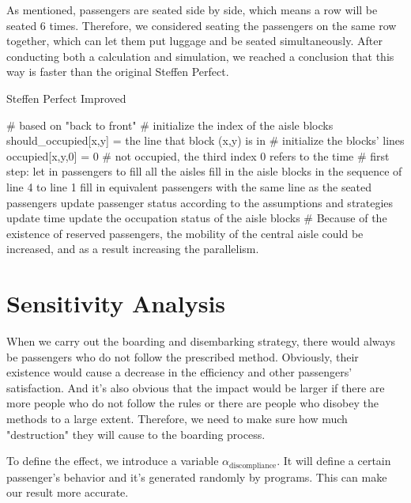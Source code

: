 \documentclass{article}
\begin{document}
	As mentioned, passengers are seated side by side, which means a row will be seated 6 times. Therefore, we considered seating the passengers on the same row together, which can let them put luggage and be seated simultaneously. After conducting both a calculation and simulation, we reached a conclusion that this way is faster than the original Steffen Perfect.

	\begin{algorithm}
		\caption{Steffen Perfect Improved}
		\begin{algorithmic}
			\STATE \# based on "back to front"
			\STATE \# initialize the index of the aisle blocks
			\STATE should\_occupied[x,y] = the line that block (x,y) is in \# initialize the blocks' lines
			\STATE occupied[x,y,0] = 0 \# not occupied, the third index 0 refers to the time
			\STATE \# first step: let in passengers to fill all the aisles
			\ENDFOR
			\STATE fill in the aisle blocks in the sequence of line 4 to line 1
			\ENDWHILE
			\STATE fill in equivalent passengers with the same line as the seated passengers
			\ENDIF
			\STATE update passenger status according to the assumptions and strategies
			\STATE update time
			\STATE update the occupation status of the aisle blocks
			\STATE \# Because of the existence of reserved passengers, the mobility of the central aisle could be increased, and as a result increasing the parallelism.
			\ENDWHILE
		\end{algorithmic}
	\end{algorithm}
	\section{Sensitivity Analysis}
	When we carry out the boarding and disembarking strategy, there would always be passengers who do not follow the prescribed method. Obviously, their existence would cause a decrease in the efficiency and other passengers' satisfaction. And it's also obvious that the impact would be larger if there are more people who do not follow the rules or there are people who disobey the methods to a large extent. Therefore, we need to make sure how much "destruction" they will cause to the boarding process.

	To define the effect, we introduce a variable $\alpha_\text{discompliance}$. It will define a certain passenger's behavior and it's generated randomly by programs. This can make our result more accurate.
\end{document}

